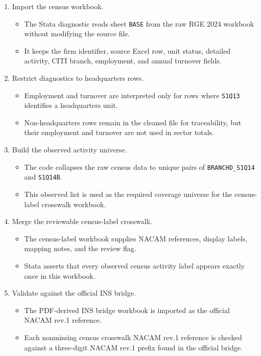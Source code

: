 \documentclass[11pt]{article}
\begin{document}
\begin{enumerate}
    \item Import the census workbook.
    \begin{itemize}
        \item The Stata diagnostic reads sheet \texttt{BASE} from the raw RGE 2024 workbook without modifying the source file.
        \item It keeps the firm identifier, source Excel row, unit status, detailed activity, CITI branch, employment, and annual turnover fields.
    \end{itemize}

    \item Restrict diagnostics to headquarters rows.
    \begin{itemize}
        \item Employment and turnover are interpreted only for rows where \texttt{S1Q13} identifies a headquarters unit.
        \item Non-headquarters rows remain in the cleaned file for traceability, but their employment and turnover are not used in sector totals.
    \end{itemize}

    \item Build the observed activity universe.
    \begin{itemize}
        \item The code collapses the raw census data to unique pairs of \texttt{BRANCHD\_S1Q14} and \texttt{S1Q14B}.
        \item This observed list is used as the required coverage universe for the census-label crosswalk workbook.
    \end{itemize}

    \item Merge the reviewable census-label crosswalk.
    \begin{itemize}
        \item The census-label workbook supplies NACAM references, display labels, mapping notes, and the review flag.
        \item Stata asserts that every observed census activity label appears exactly once in this workbook.
    \end{itemize}

    \item Validate against the official INS bridge.
    \begin{itemize}
        \item The PDF-derived INS bridge workbook is imported as the official NACAM rev.1 reference.
        \item Each nonmissing census crosswalk NACAM rev.1 reference is checked against a three-digit NACAM rev.1 prefix found in the official bridge.
    \end{itemize}


\end{enumerate}
\end{document}

